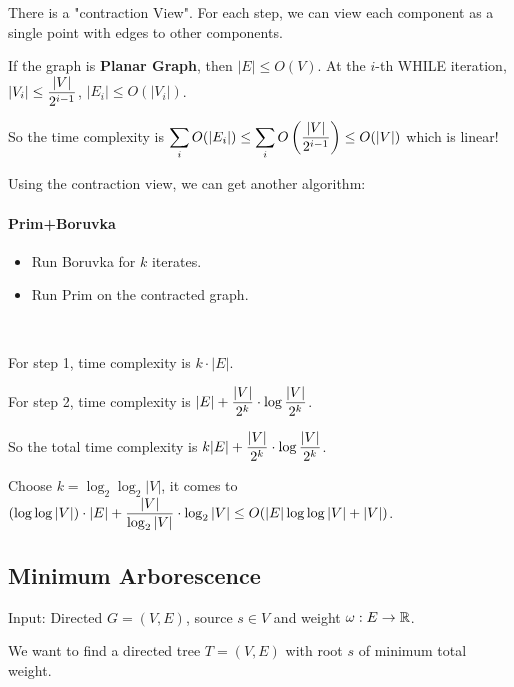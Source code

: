\begin{remark}
    There is a "contraction View". For each step, we can view each component as a single point with edges to other components.

    If the graph is \textbf{Planar Graph}, then  $ |E| \leq O(V) $. At the  $ i $-th WHILE iteration,   $ |V_i| \leq \displaystyle\frac{|V|}{2^{i-1}} $,  $ |E_i| \leq O(|V_i|) $. 
    
    So the time complexity is  $ \displaystyle\sum_{i}O(|E_i|) \leq \sum_i O\left(\displaystyle\frac{|V|}{2^{i-1}}\right) \leq O(|V|) $ which is linear! 
\end{remark}
Using the contraction view, we can get another algorithm:

\paragraph{Prim+Boruvka} 
\begin{itemize}
    \item Run Boruvka for  $ k $ iterates.
    \item Run Prim on the contracted graph.
\end{itemize}

\begin{remark}
    \,

    For step 1, time  complexity is  $ k\cdot|E| $.

    For step 2, time complexity is   $ |E|+\displaystyle\frac{|V|}{2^k}\cdot\log\frac{|V|}{2^k} $.

    So the total time complexity is  $ k|E|+\displaystyle\frac{|V|}{2^k}\cdot\log\frac{|V|}{2^k} $.

    Choose  $ k=\log_2\log_2|V| $, it  comes to  $ (\log\log|V|)\cdot |E|+\displaystyle\frac{|V|}{\log_2|V|}\cdot\log_2|V| \leq O(|E|\log\log|V|+|V|) $.
\end{remark}

\subsection{Minimum Arborescence}
\begin{example}
    Input: Directed  $ G=(V,E) $, source  $ s\in V $ and weight  $ \omega:E\rightarrow\mathbb R $. 
    
    We want to find a directed tree  $ T=(V,E) $ with root  $ s $ of  minimum total weight.

\end{example}